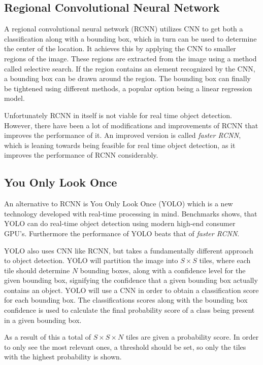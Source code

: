 \subsection{Regional Convolutional Neural Network}
A regional convolutional neural network (RCNN) utilizes CNN to get both a classification along with a bounding box, which in turn can be used to determine the center of the location.
It achieves this by applying the CNN to smaller regions of the image. 
These regions are extracted from the image using a method called selective search.
If the region contains an element recognized by the CNN, a bounding box can be drawn around the region.
The bounding box can finally be tightened using different methods, a popular option being a linear regression model.\cite{CNNHistory}

Unfortunately RCNN in itself is not viable for real time object detection.
However, there have been a lot of modifications and improvements of RCNN that improves the performance of it.
An improved version is called \textit{faster RCNN}, which is leaning towards being feasible for real time object detection, as it improves the performance of RCNN considerably\cite{fasterRCNN}.

\subsection{You Only Look Once}\label{sec:YOLOAnalysis}
An alternative to RCNN is You Only Look Once (YOLO) which is a new technology developed with real-time processing in mind.
Benchmarks shows, that YOLO can do real-time object detection using modern high-end consumer GPU's.
Furthermore the performance of YOLO beats that of \textit{faster RCNN}\cite{odDetection}.

YOLO also uses CNN like RCNN, but takes a fundamentally different approach to object detection.
YOLO will partition the image into $S\times S$ tiles, where each tile should determine $N$ bounding boxes, along with a confidence level for the given bounding box, signifying the confidence that a given bounding box actually contains an object.
YOLO will use a CNN in order to obtain a classification score for each bounding box.
The classifications scores along with the bounding box confidence is used to calculate the final probability score of a class being present in a given bounding box.\cite{odDetection}

As a result of this a total of $S\times S\times N$ tiles are given a probability score.
In order to only see the most relevant ones, a threshold should be set, so only the tiles with the highest probability is shown.

